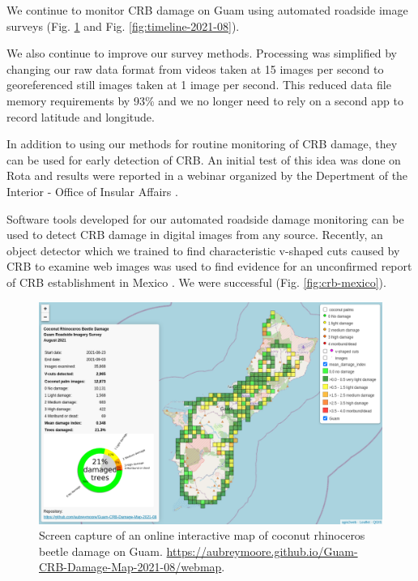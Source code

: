 \documentclass[12pt,letterpaper,english,bibliography=totocnumbered, abstract=on]{scrartcl}
\begin{document}
\clearpage

We continue to monitor CRB damage on Guam using automated roadside image surveys (Fig. \ref{fig:webmap-2021-08} and Fig. \ref{fig:timeline-2021-08}).

We also continue to improve our survey methods. Processing was simplified by changing our raw data format from videos taken at 15 images per second to georeferenced still images taken at 1 image per second. This reduced data file memory requirements by 93\% and we no longer need to rely on a second app to record latitude and longitude.

In addition to using our methods for routine monitoring of CRB damage, they can be used for early detection of CRB. An initial test of this idea was done on Rota and results were reported in a webinar organized by the Depertment of the Interior - Office of Insular Affairs  \cite{usdepartmentoftheinterior-officeofinsularaffairsYouTubeVideoCoconut2021}.

Software tools developed for our automated roadside damage monitoring can be used to detect CRB damage in digital images from any source. Recently, an object detector which we trained to find characteristic v-shaped cuts caused by CRB to examine web images was used to find evidence for an unconfirmed report of CRB establishment in Mexico \cite{jacksonSocialMediaPosts2022}. We were successful (Fig.  \ref{fig:crb-mexico}).

\begin{figure}[H]
	\centering
	\includegraphics[width=\linewidth]{../images/webmap-2021-08}
	\caption{Screen capture of an online interactive map of coconut rhinoceros beetle damage on Guam. \url{https://aubreymoore.github.io/Guam-CRB-Damage-Map-2021-08/webmap}.}
	\label{fig:webmap-2021-08}
\end{figure}
\end{document}
